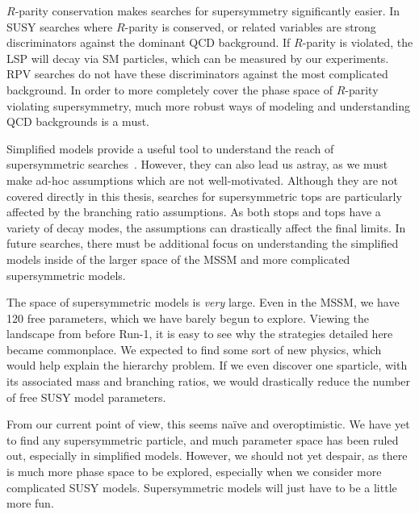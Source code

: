 $R$-parity conservation makes searches for supersymmetry significantly easier.
In SUSY searches where $R$-parity is conserved, \met or related variables are strong discriminators against the dominant QCD background.
If $R$-parity is violated, the LSP will decay via SM particles, which can be measured by our experiments.
RPV searches do not have these discriminators against the most complicated background.
In order to more completely cover the phase space of $R$-parity violating supersymmetry, much more robust ways of modeling and understanding QCD backgrounds is a must.

Simplified models provide a useful tool to understand the reach of supersymmetric searches~\cite{whitePresusy}.
However, they can also lead us astray, as we must make ad-hoc assumptions which are not well-motivated.
Although they are not covered directly in this thesis, searches for supersymmetric tops are particularly affected by the branching ratio assumptions.
As both stops and tops have a variety of decay modes, the assumptions can drastically affect the final limits.
In future searches, there must be additional focus on understanding the simplified models inside of the larger space of the MSSM and more complicated supersymmetric models.

The space of supersymmetric models is \textit{very} large.
Even in the MSSM, we have 120 free parameters, which we have barely begun to explore.
Viewing the landscape from before Run-1, it is easy to see why the strategies detailed here became commonplace.
We expected to find some sort of new physics, which would help explain the hierarchy problem.
If we even discover one sparticle, with its associated mass and branching ratios, we would drastically reduce the number of free SUSY model parameters.

From our current point of view, this seems na{\"i}ve and overoptimistic.
We have yet to find any supersymmetric particle, and much parameter space has been ruled out, especially in simplified models.
However, we should not yet despair, as there is much more phase space to be explored, especially when we consider more complicated SUSY models.
Supersymmetric models will just have to be a little more fun.